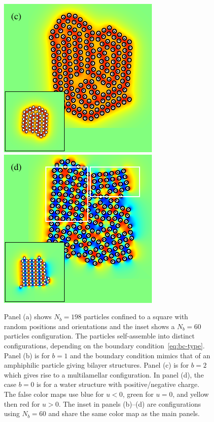 \documentclass[prb,preprint,showpacs,preprintnumbers,amsmath,amssymb,longbibliography]{revtex4-1}
\begin{document}
\begin{figure}[h!]
\begin{center}
  \includegraphics[height=0.3\textheight]{Nb198c_eta_inset.pdf}
  \includegraphics[height=0.3\textheight]{Nb198d_eta_inset.pdf}
\end{center}
\begin{caption}{\label{fig:relax}
  Panel (a) shows $N_b = 198$ particles confined to a square with random
  positions and orientations and the inset shows a $N_b=60$ particles
  configuration. The particles self-assemble into distinct
  configurations, depending on the boundary
  condition~\eqref{eq:bc-type}. Panel (b) is for $b=1$ and the boundary
  condition mimics that of an amphiphilic particle giving bilayer
  structures. Panel (c) is for $b=2$ which gives rise to a
  multilamellar configuration. In panel (d), the case $b = 0$ is for a
  water structure with positive/negative charge. The false color maps
  use blue for $u < 0$, green for $u = 0$, and yellow then red for $u >
  0$. The inset in panels (b)--(d) are configurations using $N_b=60$ and
  share the same color map as the main panels.}
\end{caption}
\end{figure}
\end{document}
